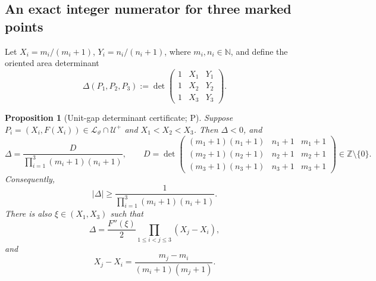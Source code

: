 \documentclass[10pt,oneside]{article}
\newtheorem{proposition}[theorem]{Proposition}
\theoremstyle{definition}
\theoremstyle{remark}
\newcommand{\N}{\mathbb N}
\newcommand{\Z}{\mathbb Z}
\newcommand{\thetaq}{\vartheta}
\newcommand{\logcurve}{\mathcal L_{\thetaq}}
\newcommand{\unitgap}{\mathcal U^{+}}
\newcommand{\statusP}{\textsc{P}}
\begin{document}
\begin{center}
\end{center}

\subsection{An exact integer numerator for three marked points}
Let \(X_i=m_i/(m_i+1)\), \(Y_i=n_i/(n_i+1)\), where \(m_i,n_i\in\N\), and define the oriented area determinant
\[
 \Delta(P_1,P_2,P_3):=
 \det\begin{pmatrix}
 1&X_1&Y_1\\
 1&X_2&Y_2\\
 1&X_3&Y_3
 \end{pmatrix}.
\]

\begin{proposition}[Unit-gap determinant certificate; \statusP]
\label{prop:unit-gap-determinant}
Suppose \(P_i=(X_i,F(X_i))\in\logcurve\cap\unitgap\) and
\(X_1<X_2<X_3\).  Then \(\Delta<0\), and
\begin{equation}
 \Delta=
 \frac{D}{\prod_{i=1}^3(m_i+1)(n_i+1)},
 \qquad
 D=\det\begin{pmatrix}
 (m_1+1)(n_1+1)&n_1+1&m_1+1\\
 (m_2+1)(n_2+1)&n_2+1&m_2+1\\
 (m_3+1)(n_3+1)&n_3+1&m_3+1
 \end{pmatrix}
 \in\Z\setminus\{0\}.
\label{eq:integer-area}
\end{equation}
Consequently,
\begin{equation}
 |\Delta|\ge
 \frac1{\prod_{i=1}^3(m_i+1)(n_i+1)}.
\label{eq:area-lower}
\end{equation}
There is also \(\xi\in(X_1,X_3)\) such that
\begin{equation}
 \Delta=\frac{F''(\xi)}2
 \prod_{1\le i<j\le3}(X_j-X_i),
\label{eq:area-upper-exact}
\end{equation}
and
\begin{equation}
 X_j-X_i=\frac{m_j-m_i}{(m_i+1)(m_j+1)}.
\label{eq:unit-gap-difference}
\end{equation}
\end{proposition}
\end{document}
